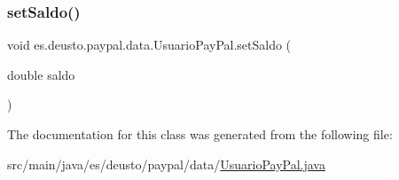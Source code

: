 \mbox{\label{classes_1_1deusto_1_1paypal_1_1data_1_1_usuario_pay_pal_a60bc14f0e90909f0aca8de4d5f1e7820}} 
\subsubsection{\texorpdfstring{setSaldo()}{setSaldo()}}
{\footnotesize\ttfamily void es.\+deusto.\+paypal.\+data.\+Usuario\+Pay\+Pal.\+set\+Saldo (\begin{DoxyParamCaption}\item[{double}]{saldo }\end{DoxyParamCaption})}



The documentation for this class was generated from the following file\+:\begin{DoxyCompactItemize}
\item 
src/main/java/es/deusto/paypal/data/\mbox{\hyperlink{_usuario_pay_pal_8java}{Usuario\+Pay\+Pal.\+java}}\end{DoxyCompactItemize}
